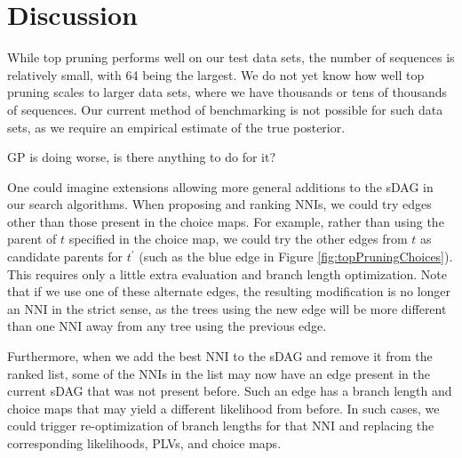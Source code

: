 \documentclass{article}
\begin{document}
\section{Discussion}


While top pruning performs well on our test data sets, the number of sequences is relatively small, with 64 being the largest. 
We do not yet know how well top pruning scales to larger data sets, where we have thousands or tens of thousands of sequences.
Our current method of benchmarking is not possible for such data sets, as we require an empirical estimate of the true posterior.

GP is doing worse, is there anything to do for it?

One could imagine extensions allowing more general additions to the sDAG in our search algorithms.
When proposing and ranking NNIs, we could try edges other than those present in the choice maps.
For example, rather than using the parent of $t$ specified in the choice map, we could try the other edges from $t$ as candidate parents for $t^{\prime}$ (such as the blue edge in Figure \ref{fig:topPruningChoices}).
This requires only a little extra evaluation and branch length optimization.
Note that if we use one of these alternate edges, the resulting modification is no longer an NNI in the strict sense, as the trees using the new edge will be more different than one NNI away from any tree using the previous edge.

Furthermore, when we add the best NNI to the sDAG and remove it from the ranked list, some of the NNIs in the list may now have an edge present in the current sDAG that was not present before. Such an edge has a branch length and choice maps that may yield a different likelihood from before. In such cases, 
we could trigger re-optimization of branch lengths for that NNI and replacing the corresponding likelihoods, PLVs, and choice maps.
















\end{document}
